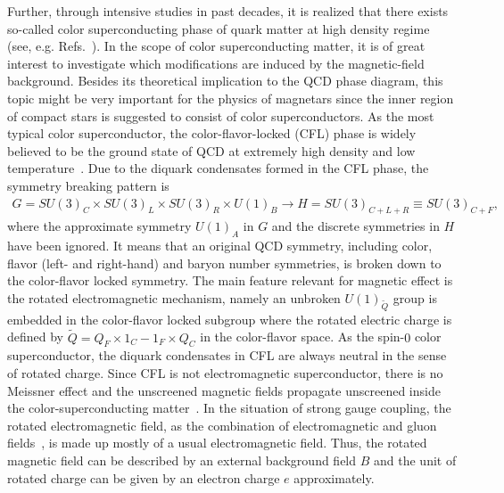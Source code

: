 \documentclass[prd, showpacs,nofootinbib,amsmath,amssymb]{revtex4}
\begin{document}
Further, through intensive studies in past decades, it is realized that there exists so-called color
superconducting phase of quark matter at high density regime (see, e.g.
Refs.~\cite{alford2004dense,buballa2005njl}). In the scope of color superconducting matter, it is of
great interest to investigate which modifications are induced by the magnetic-field background.
Besides its theoretical implication to the QCD phase diagram, this topic might be very important for the physics of magnetars since 
the inner region of compact stars is suggested to consist of color superconductors.
As the most typical color superconductor, the color-flavor-locked (CFL) phase is widely believed to be
the ground state of QCD at extremely high density and low temperature~\cite{alford1998qcd}. Due to the
diquark condensates formed in the CFL phase, the symmetry breaking pattern is
\begin{eqnarray}
G=SU(3)_{C}\times SU(3)_{L}
\times SU(3)_{R}\times U(1)_{B} \rightarrow H=SU(3)_{C+L+R}\equiv SU(3)_{C+F},\label{cfl}
\end{eqnarray}
where the approximate symmetry $U(1)_{A}$ in $G$ and the discrete symmetries in $H$ have been ignored.
It means that an original QCD symmetry, including color, flavor (left- and right-hand) and baryon number
symmetries, is broken down to the color-flavor locked symmetry.
The main feature relevant for magnetic effect is the rotated electromagnetic mechanism, namely an unbroken
$U(1)_{\widetilde{Q}}$ group is embedded in the color-flavor locked subgroup where the rotated electric
charge is defined by $\widetilde{Q}=Q_{F}\times {1}_{C}-{1}_{F}\times Q_{C}$ in the color-flavor space.
As the spin-$0$ color superconductor, the diquark condensates in CFL are always neutral in the sense of
rotated charge.
Since CFL is not electromagnetic superconductor, there is no Meissner effect and the unscreened magnetic
fields propagate unscreened inside the color-superconducting matter~\cite{alford1998qcd,alford2000magnetic}.
In the situation of strong gauge coupling, the rotated electromagnetic field, as the combination of
electromagnetic and gluon fields~\cite{alford1998qcd,alford2000magnetic}, is made up mostly of a usual
electromagnetic field. Thus, the rotated magnetic field can be described by an external background field
$B$ and the unit of rotated charge can be given by an electron charge $e$ approximately.
\end{document}

